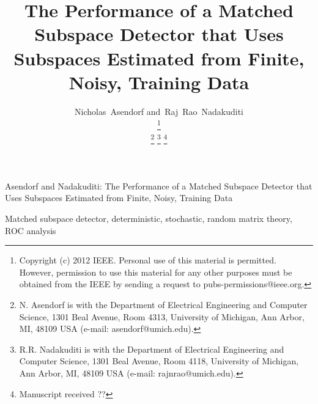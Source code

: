 \documentclass[10pt,twocolumn,twoside]{IEEEtran}
\begin{document}
%
\title{The Performance of a Matched Subspace Detector that Uses Subspaces Estimated from Finite, Noisy, Training Data}


\author{Nicholas~Asendorf
        and~Raj~Rao~Nadakuditi\\

\thanks{Copyright (c) 2012 IEEE. Personal use of this material is permitted. However, permission to use this material for any other purposes must be obtained from the IEEE by sending a request to pubs-permissions@ieee.org.}

\thanks{N. Asendorf is with the Department
of Electrical Engineering and Computer Science, 1301 Beal Avenue, Room 4313, University of Michigan, Ann Arbor,
MI, 48109 USA (e-mail: asendorf@umich.edu).}%
\thanks{R.R. Nadakuditi is with the Department
of Electrical Engineering and Computer Science, 1301 Beal Avenue, Room 4118, University of Michigan, Ann Arbor,
MI, 48109 USA (e-mail: rajnrao@umich.edu).}%
\thanks{Manuscript received ??}}

%
{Asendorf and Nadakuditi: The Performance of a Matched Subspace Detector that Uses Subspaces Estimated from Finite, Noisy, Training Data}
%

\maketitle


\begin{abstract}

\end{abstract}

\begin{IEEEkeywords}
Matched subspace detector, deterministic, stochastic, random matrix theory, ROC analysis
\end{IEEEkeywords}


\IEEEpeerreviewmaketitle
\end{document}
